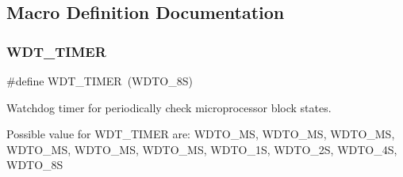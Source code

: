 \subsection{Macro Definition Documentation}
\mbox{\label{i2c-th-config_8h_a983c9777673ee873f12ec9f489215321}} 
\subsubsection{\texorpdfstring{W\+D\+T\+\_\+\+T\+I\+M\+ER}{WDT\_TIMER}}
{\footnotesize\ttfamily \#define W\+D\+T\+\_\+\+T\+I\+M\+ER~(W\+D\+T\+O\+\_\+8S)}



Watchdog timer for periodically check microprocessor block states. 

Possible value for W\+D\+T\+\_\+\+T\+I\+M\+ER are\+: W\+D\+T\+O\+\_\+MS, W\+D\+T\+O\+\_\+MS, W\+D\+T\+O\+\_\+MS, W\+D\+T\+O\+\_\+MS, W\+D\+T\+O\+\_\+MS, W\+D\+T\+O\+\_\+MS, W\+D\+T\+O\+\_\+1S, W\+D\+T\+O\+\_\+2S, W\+D\+T\+O\+\_\+4S, W\+D\+T\+O\+\_\+8S 